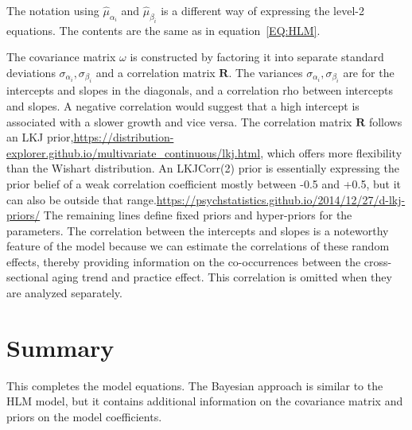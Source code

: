 \documentclass{article}
\begin{document}
The notation using $\hat\mu_{\alpha_i}$
and $\hat\mu_{\beta_i}$ is a different way of
expressing the level-2 equations.  The contents are the
same as in equation~\eqref{EQ:HLM}.

The covariance matrix $\omega$
is constructed by factoring
it into separate standard deviations 
$\sigma_{\alpha_i}, \sigma_{\beta_i}$ and 
a correlation matrix $\boldsymbol{R}$.  
The variances
$\sigma_{\alpha_i}, \sigma_{\beta_i}$ are
for the intercepts and slopes in the diagonals, and a
correlation rho between intercepts and slopes. A negative
correlation would suggest that a high intercept is
associated with a slower growth and vice versa.
The correlation matrix $\boldsymbol{R}$
follows an LKJ
prior,\url{https://distribution-explorer.github.io/multivariate_continuous/lkj.html},
which offers more flexibility than
the Wishart distribution.
An LKJCorr(2) prior is essentially expressing the prior
belief of a weak correlation coefficient mostly between -0.5 and
+0.5, but it can also be outside that
range.\url{https://psychstatistics.github.io/2014/12/27/d-lkj-priors/}
The remaining lines define fixed priors and hyper-priors
for the parameters. 
The correlation between the intercepts and slopes 
is a noteworthy feature of the model because we can
estimate the correlations of these random effects,
thereby providing
information on the co-occurrences between the
cross-sectional aging trend and practice effect.  This
correlation is omitted when they are analyzed separately.  

\section{Summary}
This completes the model equations.  The Bayesian
approach is similar to the HLM model, but it contains
additional information on the covariance matrix and
priors on the model coefficients.
\end{document}

